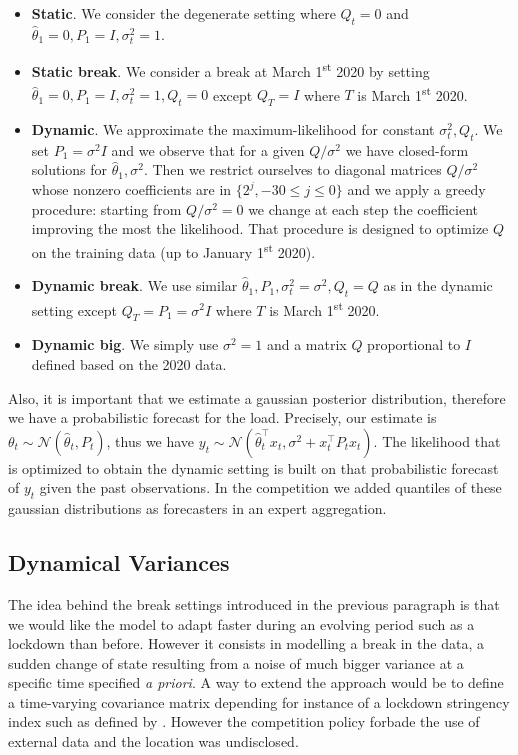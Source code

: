 \documentclass[transmag]{IEEEtran}
\begin{document}
\begin{itemize}
\item
\textbf{Static}. We consider the degenerate setting where $Q_t=0$ and $\hat\theta_1=0,P_1=I,\sigma_t^2=1$.

\item
\textbf{Static break}. We consider a break at March 1\textsuperscript{st} 2020 by setting $\hat\theta_1=0,P_1=I,\sigma_t^2=1,Q_t=0$ except $Q_T=I$ where $T$ is March 1\textsuperscript{st} 2020.

\item
\textbf{Dynamic}. We approximate the maximum-likelihood for constant $\sigma_t^2,Q_t$. We set $P_1=\sigma^2 I$ and we observe that for a given $Q/\sigma^2$ we have closed-form solutions for $\hat\theta_1, \sigma^2$. Then we restrict ourselves to diagonal matrices $Q/\sigma^2$ whose nonzero coefficients are in $\{2^j,-30\le j\le 0\}$ and we apply a greedy procedure: starting from $Q/\sigma^2=0$ we change at each step the coefficient improving the most the likelihood. That procedure is designed to optimize $Q$ on the training data (up to January 1\textsuperscript{st} 2020).

\item
\textbf{Dynamic break}. We use similar $\hat\theta_1,P_1,\sigma_t^2=\sigma^2,Q_t=Q$ as in the dynamic setting except $Q_T=P_1=\sigma^2 I$ where $T$ is March 1\textsuperscript{st} 2020.

\item
\textbf{Dynamic big}. We simply use $\sigma^2=1$ and a matrix $Q$ proportional to $I$ defined based on the 2020 data.
\end{itemize}

Also, it is important that we estimate a gaussian posterior distribution, therefore we have a probabilistic forecast for the load. Precisely, our estimate is $\theta_t\sim\mathcal{N}(\hat\theta_t,P_t)$, thus we have $y_t\sim\mathcal{N}(\hat\theta_t^\top x_t, \sigma^2+x_t^\top P_t x_t)$. The likelihood that is optimized to obtain the dynamic setting is built on that probabilistic forecast of $y_t$ given the past observations.
In the competition we added quantiles of these gaussian distributions as forecasters in an expert aggregation.




\subsection{Dynamical Variances}
The idea behind the break settings introduced in the previous paragraph is that we would like the model to adapt faster during an evolving period such as a lockdown than before. However it consists in modelling a break in the data, a sudden change of state resulting from a noise of much bigger variance at a specific time specified {\it a priori}. A way to extend the approach would be to define a time-varying covariance matrix depending for instance of a lockdown stringency index such as defined by \cite{hale2021global}. However the competition policy forbade the use of external data and the location was undisclosed.
\end{document}
